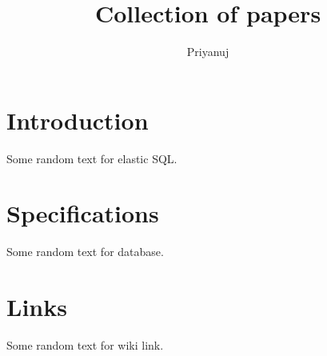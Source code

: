 \documentclass[conference]{IEEEtran}
\title{Collection of papers}
\author{Priyanuj}
\date{}
\begin{document}
	
	\maketitle
	\section{Introduction}
	Some random text for elastic SQL. \cite{Tatemura} \lipsum[1-2]
	
	\section{Specifications}
	Some random text for database. \cite{ullman} \lipsum[1-2]
	
	\section{Links}
	Some random text for wiki link. \cite{wiki} \lipsum[1-2]
	
	
	
\end{document}

